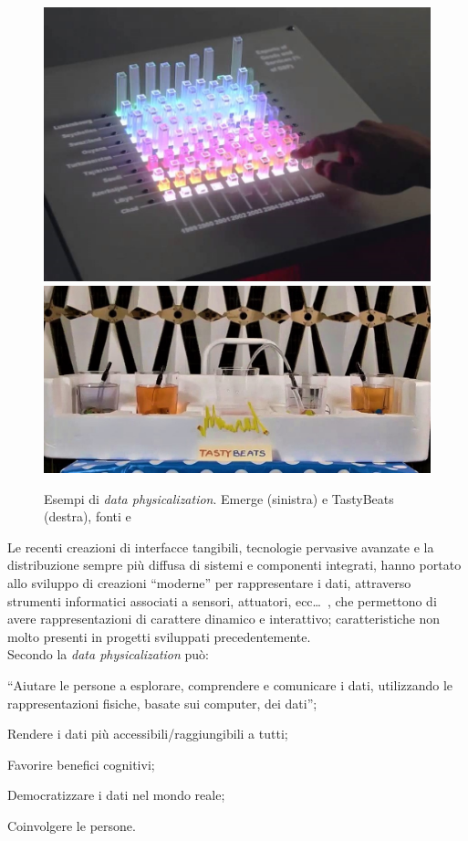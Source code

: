 \documentclass[12pt,a4paper]{report}
\begin{document}
\begin{figure}
	\begin{center}
		\centerline
		{
			\includegraphics[width=.400\textwidth]{Immagini/emergePhysicalPlots.jpg}
			\includegraphics[width=.585\textwidth]{Immagini/tastybeats.jpg}			
		}
		\caption{Esempi di \textit{data physicalization}. Emerge (sinistra) e TastyBeats (destra), fonti \cite{emergePhysicalPlot} e \cite{tastybeats}}
		\label{fig:examples_other_phys}
	\end{center}
\end{figure}


Le recenti creazioni di interfacce tangibili, tecnologie pervasive avanzate e la distribuzione sempre più diffusa di sistemi e componenti integrati, hanno portato allo sviluppo di creazioni ``moderne'' per rappresentare i dati, attraverso strumenti informatici associati a sensori, attuatori, ecc\dots\ , che permettono di avere rappresentazioni di carattere dinamico e interattivo; caratteristiche non molto presenti in progetti sviluppati precedentemente.\\ %

Secondo \cite{jansen2015opportunities} la \textit{data physicalization} può:
\begin{compactitem}
	\item ``Aiutare le persone a esplorare, comprendere e comunicare i dati, utilizzando le rappresentazioni fisiche, basate sui computer, dei dati'';
	\item Rendere i dati più accessibili/raggiungibili a tutti;
	\item Favorire benefici cognitivi;
	\item Democratizzare i dati nel mondo reale;
	\item Coinvolgere le persone.
\end{compactitem}
\end{document}
